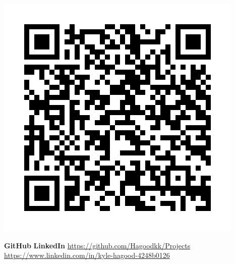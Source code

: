 \documentclass{article}
\begin{document}
\begin{center}
\includegraphics[scale=0.1]{Resume_Barcode}
\end{center}

\vfill

\large \hfill \newline \textbf{GitHub} \hfill \textbf{LinkedIn} \newline 
\normalsize \url{https://github.com/Hagoodkk/Projects} \hfill \url{https://www.linkedin.com/in/kyle-hagood-4248b0126}
\end{document}

